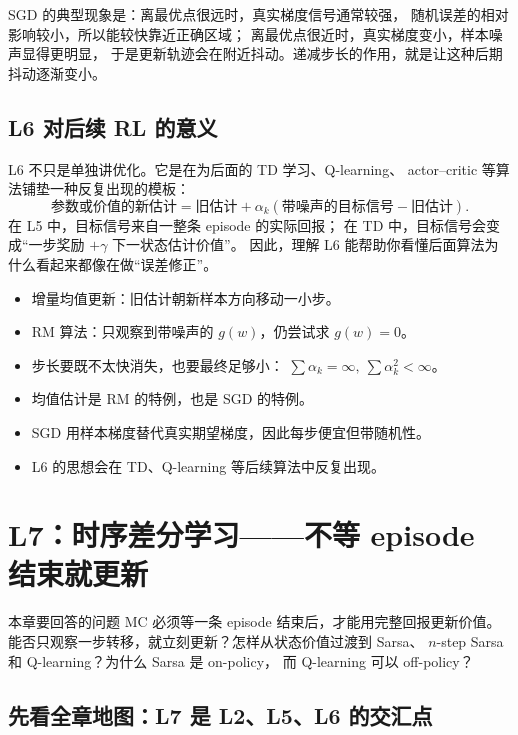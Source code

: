\documentclass[11pt,a4paper,fontset=fandol]{ctexart}
\begin{document}
SGD 的典型现象是：离最优点很远时，真实梯度信号通常较强，
随机误差的相对影响较小，所以能较快靠近正确区域；
离最优点很近时，真实梯度变小，样本噪声显得更明显，
于是更新轨迹会在附近抖动。递减步长的作用，就是让这种后期抖动逐渐变小。

\subsection{L6 对后续 RL 的意义}

L6 不只是单独讲优化。它是在为后面的 TD 学习、Q-learning、
actor--critic 等算法铺垫一种反复出现的模板：
\[
\text{参数或价值的新估计}
=
\text{旧估计}
+\alpha_k
\left(\text{带噪声的目标信号}-\text{旧估计}\right).
\]
在 L5 中，目标信号来自一整条 episode 的实际回报；
在 TD 中，目标信号会变成“一步奖励 \(+\gamma\) 下一状态估计价值”。
因此，理解 L6 能帮助你看懂后面算法为什么看起来都像在做“误差修正”。

\begin{memorybox}
\begin{itemize}
  \item 增量均值更新：旧估计朝新样本方向移动一小步。
  \item RM 算法：只观察到带噪声的 \(g(w)\)，仍尝试求 \(g(w)=0\)。
  \item 步长要既不太快消失，也要最终足够小：
  \(\sum\alpha_k=\infty,\ \sum\alpha_k^2<\infty\)。
  \item 均值估计是 RM 的特例，也是 SGD 的特例。
  \item SGD 用样本梯度替代真实期望梯度，因此每步便宜但带随机性。
  \item L6 的思想会在 TD、Q-learning 等后续算法中反复出现。
\end{itemize}
\end{memorybox}

\clearpage
\section{L7：时序差分学习——不等 episode 结束就更新}

\begin{goalbox}{本章要回答的问题}
MC 必须等一条 episode 结束后，才能用完整回报更新价值。
能否只观察一步转移，就立刻更新？怎样从状态价值过渡到 Sarsa、
\(n\)-step Sarsa 和 Q-learning？为什么 Sarsa 是 on-policy，
而 Q-learning 可以 off-policy？
\end{goalbox}

\subsection{先看全章地图：L7 是 L2、L5、L6 的交汇点}
\end{document}
